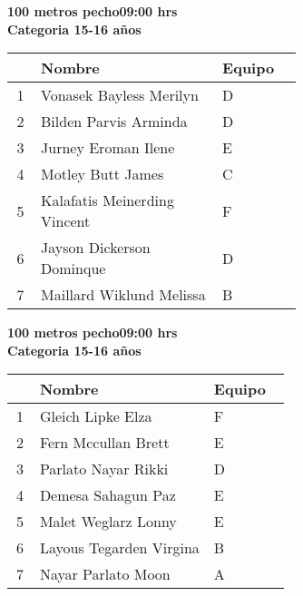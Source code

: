 \begin{minipage}{0.95\linewidth}\vspace{0.5cm} 
\begin{flushleft}
\textbf{
\hspace{-0.15cm}100 metros pecho\hspace{1.5cm}09:00 hrs \\Categoria 15-16 años}\vspace{-0.2cm} 
\end{flushleft}
\begin{tabular}{cp{0.63\linewidth}l}
\hline
& \textbf{Nombre} & \textbf{Equipo} \\ \hline
1 & Vonasek Bayless Merilyn & D \\ 
2 & Bilden Parvis Arminda & D \\ 
3 & Jurney Eroman Ilene & E \\ 
4 & Motley Butt James & C \\ 
5 & Kalafatis Meinerding Vincent & F \\ 
6 & Jayson Dickerson Dominque & D \\ 
7 & Maillard Wiklund Melissa & B \\ 
\end{tabular}
\end{minipage}
\begin{minipage}{0.95\linewidth}\vspace{0.5cm} 
\begin{flushleft}
\textbf{
\hspace{-0.15cm}100 metros pecho\hspace{1.5cm}09:00 hrs \\Categoria 15-16 años}\vspace{-0.2cm} 
\end{flushleft}
\begin{tabular}{cp{0.63\linewidth}l}
\hline
& \textbf{Nombre} & \textbf{Equipo} \\ \hline
1 & Gleich Lipke Elza & F \\ 
2 & Fern Mccullan Brett & E \\ 
3 & Parlato Nayar Rikki & D \\ 
4 & Demesa Sahagun Paz & E \\ 
5 & Malet Weglarz Lonny & E \\ 
6 & Layous Tegarden Virgina & B \\ 
7 & Nayar Parlato Moon & A \\ 
\end{tabular}
\end{minipage}
